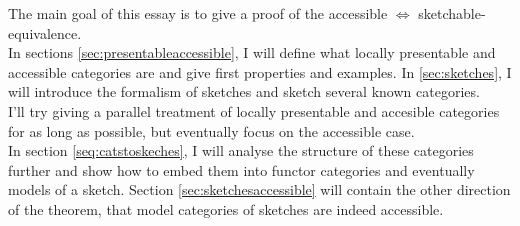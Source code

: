 The main goal of this essay is to give a proof of the accessible $\Leftrightarrow$ sketchable-equivalence. \\

 In sections \ref{sec:presentableaccessible}, I will define what locally presentable and accessible categories are and give first properties and examples. In \ref{sec:sketches}, I will introduce the formalism of sketches and sketch several known categories. \\

I'll try giving a parallel treatment of locally presentable and accesible categories for as long as possible, but eventually focus on the accessible case. \\

In section \ref{seq:catstoskeches}, I will analyse the structure of these categories further and show how to embed them into functor categories and eventually models of a sketch. Section \ref{sec:sketchesaccessible} will contain the other direction of the theorem, that model categories of sketches are indeed accessible.